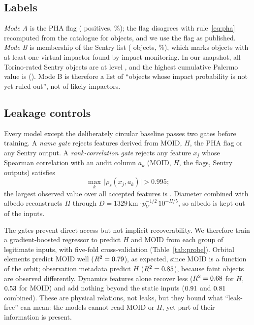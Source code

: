 \documentclass[journal]{IEEEtran}
\begin{document}
\begin{table}[t]
\caption{Input features. The first four groups form the leak-free static set (\NStaticFeat{} inputs).}
\label{tab:features}
\centering
\footnotesize

\end{table}

\subsection{Labels}
\emph{Mode A} is the PHA flag (\NPHA{} positives, \PrevPHA\%); the flag disagrees with rule~\eqref{eq:pha} recomputed from the catalogue for \NPhaDisagree{} objects, and we use the flag as published. \emph{Mode B} is membership of the Sentry list (\NSentry{} objects, \PrevSentry\%), which marks objects with at least one virtual impactor found by impact monitoring. In our snapshot, all \NTorinoRated{} Torino-rated Sentry objects are at level \TorinoMax{}, and the highest cumulative Palermo value is \PalermoMax{} (\PalermoMaxName). Mode B is therefore a list of ``objects whose impact probability is not yet ruled out'', not of likely impactors.

\subsection{Leakage controls}
Every model except the deliberately circular baseline passes two gates before training. A \emph{name gate} rejects features derived from MOID, $H$, the PHA flag or any Sentry output. A \emph{rank-correlation gate} rejects any feature $x_j$ whose Spearman correlation with an audit column $a_k$ (MOID, $H$, the flags, Sentry outputs) satisfies
\begin{equation}
\max_k \,\lvert \rho_s(x_j, a_k) \rvert > 0.995 ;
\end{equation}
the largest observed value over all accepted features is \MaxRankCorr. Diameter combined with albedo reconstructs $H$ through $D = 1329\,\mathrm{km}\cdot p_V^{-1/2}\,10^{-H/5}$, so albedo is kept out of the inputs.

The gates prevent direct access but not implicit recoverability. We therefore train a gradient-boosted regressor to predict $H$ and MOID from each group of legitimate inputs, with five-fold cross-validation (Table~\ref{tab:probe}). Orbital elements predict MOID well ($R^2=0.79$), as expected, since MOID is a function of the orbit; observation metadata predict $H$ ($R^2=0.85$), because faint objects are observed differently. Dynamics features alone recover less ($R^2=0.68$ for $H$, $0.53$ for MOID) and add nothing beyond the static inputs ($0.91$ and $0.81$ combined). These are physical relations, not leaks, but they bound what ``leak-free'' can mean: the models cannot read MOID or $H$, yet part of their information is present.
\end{document}
